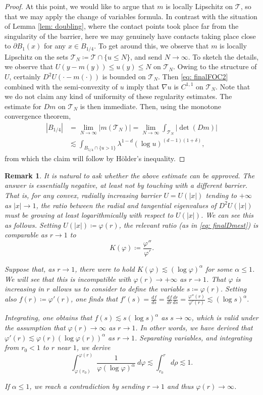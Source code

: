 \documentclass[reqno]{amsart}
\numberwithin{equation}{section}
\newtheorem{preremark}[thm]{Remark}
\newenvironment{remark}{\begin{preremark}\rm}{\medskip \end{preremark}}
\numberwithin{equation}{section}
\newcommand{\vphi}{\varphi}
\newcommand{\ds}{\displaystyle}
\begin{document}
\begin{proof}
At this point, we would like to argue that $m$ is locally Lipschitz on $\mathcal{T}$, so that we may apply the change of variables formula. In contrast with the situation of Lemma \ref{lem: doubling}, where the contact points took place far from the singularity of the barrier, here we may genuinely have contacts taking place close to $\partial B_1(x)$ for any $x \in B_{1/4}$. To get around this, we observe that $m$ is locally Lipschitz on the sets $\mathcal{T}_N \coloneqq \mathcal{T} \cap \{u\le N\}$, and send $N \to \infty$. To sketch the details, we observe that $U(y-m(y))\le u(y) \le N$ on $\mathcal{T}_N$. Owing to the structure of $U$, certainly $D^2U(\cdot - m(\cdot))$ is bounded on $\mathcal{T}_N$. Then \eqref{eq: finalFOC2} combined with the semi-convexity of $u$ imply that $\nabla u$ is $C^{1,1}$ on $\mathcal{T}_N$. Note that we do not claim any kind of uniformity of these regularity estimates. The estimate for $Dm$ on $\mathcal{T}_N$ is then immediate. Then, using the monotone convergence theorem,
\begin{align}  
|B_{1/4}| &= \lim_{N \to \infty}|m(\mathcal{T}_N)| = \lim_{N \to \infty} \int_{\mathcal{T}_N} |\det(Dm)|\\
&\lesssim  \int_{B_{5/4} \cap \{u>1\}} \lambda^{1-d}(\log u)^{(d-1)(1+\delta)},
\end{align}
from which the claim will follow by H{\"o}lder's inequality. 
\end{proof}
\begin{remark}
    It is natural to ask whether the above estimate can be approved. The answer is essentially negative, at least not by touching with a different barrier. That is, for any convex, radially increasing barrier $U = U(|x|)$ tending to $+\infty$ as $|x| \to 1$, the ratio between the radial and tangential eigenvalues of $D^2U(|x|)$ must be growing at least logarithmically with respect to $U(|x|)$. We can see this as follows. Setting $U(|x|) \coloneqq \vphi(r)$, the relevant ratio (as in \eqref{eq: finalDmest}) is comparable as $r \to 1$ to 
    $$K(\vphi) \coloneqq \frac{\vphi''}{\vphi'}.$$

    Suppose that, as $r \to 1$, there were to hold $K(\vphi) \lesssim (\log \vphi)^\alpha$ for some $\alpha \le 1$. We will see that this is incompatible with $\vphi(r) \to + \infty$ as $r\to 1$. That $\vphi$ is increasing in $r$ allows us to consider to define the variable $s \coloneqq  \vphi(r)$. Setting also $f(r) \coloneqq  \vphi'(r)$, one finds that $f'(s) = \ds \frac{df}{ds} = \frac{df}{dr} \frac{dr}{ds} = \frac{\vphi''(r)}{\vphi'(r)} \lesssim (\log s)^\alpha.$

    Integrating, one obtains that $f(s) \lesssim s(\log  s)^\alpha$ as $s \to \infty$, which is valid under the assumption that $\vphi(r) \to \infty$ as $r\to 1$. In other words, we have derived that $\vphi'(r) \lesssim \vphi(r) (\log \vphi(r))^\alpha$ as $r\to 1$. Separating variables, and integrating from $r_0<1$ to $r$ near $1$, we derive
    $$\int_{\vphi(r_0)}^{\vphi(r)} \frac{1}{\vphi (\log \vphi)^{\alpha}} \ d\vphi \lesssim \int_{r_0}^r \ d\rho \lesssim 1.$$

    If $\alpha \le 1$, we reach a contradiction by sending $r \to 1$ and thus $\vphi(r) \to \infty$. 
\end{remark}
\end{document}
